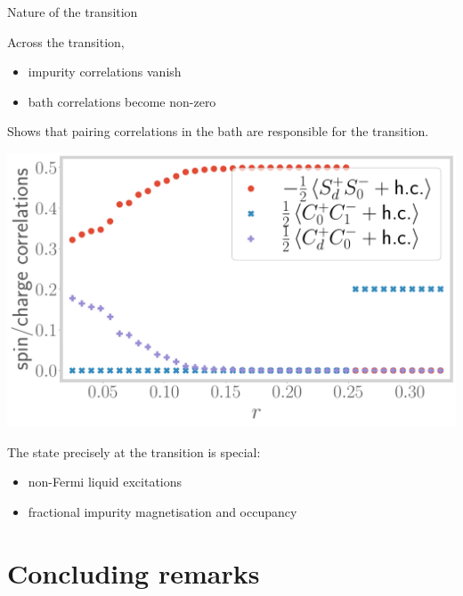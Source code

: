 \documentclass[aspectratio=169]{beamer}
\begin{document}
\begin{frame}{Nature of the transition}
\begin{minipage}{0.45\textwidth}
Across the transition,\\
\begin{itemize}
	\item impurity correlations vanish
	\item bath correlations become non-zero\\[10pt]
\end{itemize}

Shows that \alert{pairing correlations} in the bath are responsible for the transition.
\end{minipage}
\hspace*{\fill}
\begin{minipage}{0.5\textwidth}
\includegraphics[width=\textwidth]{spin-charge-corr-full.pdf}
\end{minipage}

\vspace*{\fill}
The state \alert{precisely at the transition} is special:
\begin{itemize}
	\item non-Fermi liquid excitations
	\item \alert{fractional} impurity magnetisation and occupancy
\end{itemize}
\end{frame}

\section{Concluding remarks}
\subsection{~}
\end{document}
